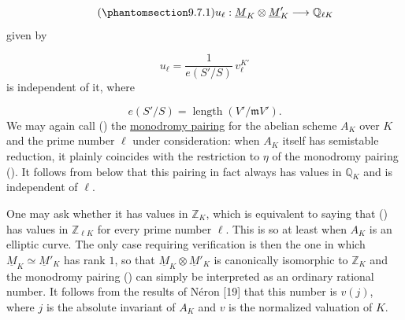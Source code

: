 \begin{equation}\tag{\SGARefTarget{sga7.sga7i.eix.n9-7-1}{9.7.1}}
u_\ell:\underline M_K\otimes\underline M'_K
 \longrightarrow\mathbb Q_{\ell K}
\end{equation}
given by

\begin{equation*}
u_\ell=\frac{1}{e(S'/S)}\,v_\ell^{K'}
\end{equation*}
is independent of it, where

\begin{equation*}
e(S'/S)=\operatorname{length}(V'/\mathfrak mV').
\end{equation*}
We may again call () the \underline{monodromy pairing} for the
abelian scheme $A_K$ over $K$ and the prime number $\ell$ under
consideration: when $A_K$ itself has semistable reduction, it plainly
coincides with the restriction to $\eta$ of the monodromy pairing ().
It follows from  below that this pairing in fact always has values in
$\mathbb Q_K$ and is independent of $\ell$.

One may ask whether it has values in $\mathbb Z_K$, which is equivalent to
saying that () has values in $\mathbb Z_{\ell K}$ for every prime
number $\ell$. This is so at least when $A_K$ is an elliptic curve. The
only case requiring verification is then the one in which
$\underline M_K\simeq\underline M'_K$ has rank $1$, so that
$\underline M_K\otimes\underline M'_K$ is canonically isomorphic to
$\mathbb Z_K$ and the monodromy pairing () can simply be interpreted
as an ordinary rational number. It follows from the results of Néron [19]
that this number is $v(j)$, where $j$ is the absolute invariant of $A_K$
and $v$ is the normalized valuation of $K$.


